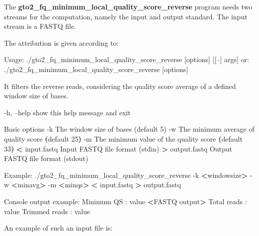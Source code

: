 \documentclass[11pt,]{krantz}
\newenvironment{Shaded}{\begin{snugshade}}{\end{snugshade}}
\newcommand{\KeywordTok}[1]{\textcolor[rgb]{0.27,0.27,0.27}{\textbf{#1}}}
\newcommand{\OperatorTok}[1]{\textcolor[rgb]{0.43,0.43,0.43}{\textbf{#1}}}
\newcommand{\ExtensionTok}[1]{#1}
\newcommand{\NormalTok}[1]{#1}
\begin{document}
The \textbf{gto2\_fq\_minimum\_local\_quality\_score\_reverse} program
needs two streams for the computation, namely the input and output
standard. The input stream is a FASTQ file.

The attribution is given according to:

\begin{Shaded}
\begin{Highlighting}[]
\ExtensionTok{Usage}\NormalTok{: ./gto2_fq_minimum_local_quality_score_reverse [options] [[--] args]}
   \ExtensionTok{or}\NormalTok{: ./gto2_fq_minimum_local_quality_score_reverse [options]}

\ExtensionTok{It}\NormalTok{ filters the reverse reads, considering the quality score }
\ExtensionTok{average}\NormalTok{ of a defined }
\ExtensionTok{window}\NormalTok{ size of bases.}

    \ExtensionTok{-h}\NormalTok{, --help        show this help message and exit}

\ExtensionTok{Basic}\NormalTok{ options}
    \ExtensionTok{-k}\NormalTok{                The window size of bases (default 5)}
    \ExtensionTok{-w}\NormalTok{                The minimum average of quality score }
                      \KeywordTok{(}\ExtensionTok{default}\NormalTok{ 25}\KeywordTok{)}
    \ExtensionTok{-m}\NormalTok{                The minimum value of the quality score}
                      \KeywordTok{(}\ExtensionTok{default}\NormalTok{ 33}\KeywordTok{)}
    \OperatorTok{<} \ExtensionTok{input.fastq}\NormalTok{     Input FASTQ file format (stdin)}
    \OperatorTok{>} \ExtensionTok{output.fastq}\NormalTok{    Output FASTQ file format (stdout)}

\ExtensionTok{Example}\NormalTok{: ./gto2_fq_minimum_local_quality_score_reverse }
\ExtensionTok{-k} \OperatorTok{<}\NormalTok{windowsize}\OperatorTok{>}\NormalTok{ -w }\OperatorTok{<}\NormalTok{minavg}\OperatorTok{>}\NormalTok{ -m }\OperatorTok{<}\NormalTok{minqs}\OperatorTok{>} 
\OperatorTok{<} \ExtensionTok{input.fastq} \OperatorTok{>}\NormalTok{ output.fastq}

\ExtensionTok{Console}\NormalTok{ output example:}
\ExtensionTok{Minimum}\NormalTok{ QS       : value}
\OperatorTok{<}\ExtensionTok{FASTQ}\NormalTok{ output}\OperatorTok{>}
\ExtensionTok{Total}\NormalTok{ reads      : value}
\ExtensionTok{Trimmed}\NormalTok{ reads    : value}
\end{Highlighting}
\end{Shaded}

An example of such an input file is:
\end{document}
